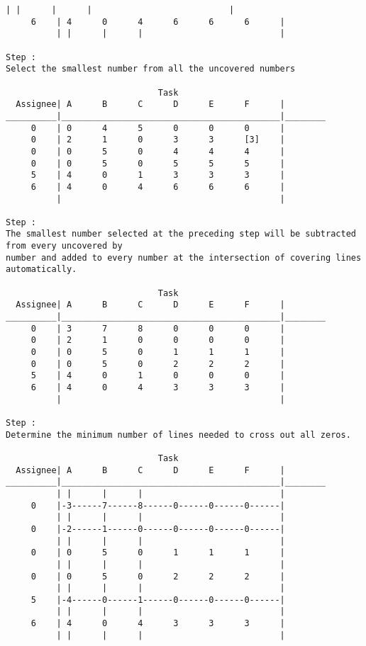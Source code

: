 \documentclass[titlepage, letterpaper]{article}
\begin{document}
\begin{lstlisting}[basicstyle=\tiny]
          | |      |      |                           |
     6    | 4      0      4      6      6      6      |
          | |      |      |                           |

Step :
Select the smallest number from all the uncovered numbers

                              Task
  Assignee| A      B      C      D      E      F      |
__________|___________________________________________|________
     0    | 0      4      5      0      0      0      | 
     0    | 2      1      0      3      3      [3]    | 
     0    | 0      5      0      4      4      4      | 
     0    | 0      5      0      5      5      5      | 
     5    | 4      0      1      3      3      3      | 
     6    | 4      0      4      6      6      6      | 
          |                                           | 

Step :
The smallest number selected at the preceding step will be subtracted from every uncovered by 
number and added to every number at the intersection of covering lines automatically. 

                              Task
  Assignee| A      B      C      D      E      F      |
__________|___________________________________________|________
     0    | 3      7      8      0      0      0      | 
     0    | 2      1      0      0      0      0      | 
     0    | 0      5      0      1      1      1      | 
     0    | 0      5      0      2      2      2      | 
     5    | 4      0      1      0      0      0      | 
     6    | 4      0      4      3      3      3      | 
          |                                           | 

Step :
Determine the minimum number of lines needed to cross out all zeros.

                              Task
  Assignee| A      B      C      D      E      F      |
__________|___________________________________________|________
          | |      |      |                           |
     0    |-3------7------8------0------0------0------|
          | |      |      |                           |
     0    |-2------1------0------0------0------0------|
          | |      |      |                           |
     0    | 0      5      0      1      1      1      |
          | |      |      |                           |
     0    | 0      5      0      2      2      2      |
          | |      |      |                           |
     5    |-4------0------1------0------0------0------|
          | |      |      |                           |
     6    | 4      0      4      3      3      3      |
          | |      |      |                           |


\end{lstlisting}
\end{document}
